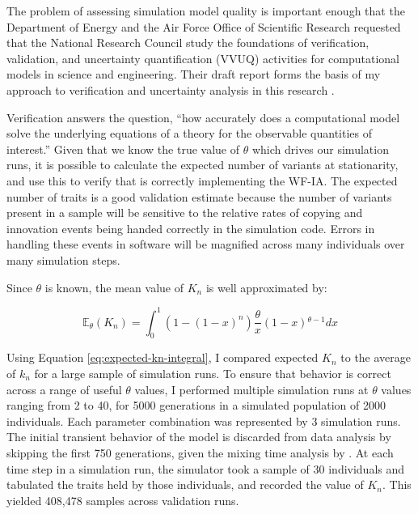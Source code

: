The problem of assessing simulation model quality is important enough that the Department of Energy and the Air Force Office of Scientific Research requested that the National Research Council study the foundations of verification, validation, and uncertainty quantification (VVUQ) activities for computational models in science and engineering.  Their draft report forms the basis of my approach to verification and uncertainty analysis in this research \citep{national2012Assessing}.%

Verification answers the question, ``how accurately does a computational model solve the underlying equations of a theory for the observable quantities of interest.''  %
Given that we know the true value of $\theta$ which drives our simulation runs, it is possible to calculate the expected number of variants at stationarity, and use this to verify that \tf is correctly implementing the WF-IA.   The expected number of traits is a good validation estimate because the number of variants present in a sample will be sensitive to the relative rates of copying and innovation events being handed correctly in the simulation code.  Errors in handling these events in software will be magnified across many individuals over many simulation steps.  

Since $\theta$ is known, the mean value of $K_n$ is well approximated by:

\begin{equation} 
\label{eq:expected-kn-integral}
	\mathbb{E}_{\theta}(K_n) = \int _0^1\left(1-(1-x)^n\right)\frac{\theta }{x}(1-x){}^{\theta -1} dx
\end{equation}

Using Equation \eqref{eq:expected-kn-integral}, I compared expected $K_n$ to the average of $k_n$  for a large sample of simulation runs.  To ensure that behavior is correct across a range of useful $\theta$ values, I performed multiple simulation runs at $\theta$ values ranging from 2 to 40, for 5000 generations in a simulated population of 2000 individuals.  Each parameter combination was represented by 3 simulation runs.  The initial transient behavior of the model is discarded from data analysis by skipping the first 750 generations, given the mixing time analysis by \citet{Watkins2010}.  At each time step in a simulation run, the simulator took a sample of 30 individuals and tabulated the traits held by those individuals, and recorded the value of $K_n$.  This yielded 408,478 samples across validation runs.  

